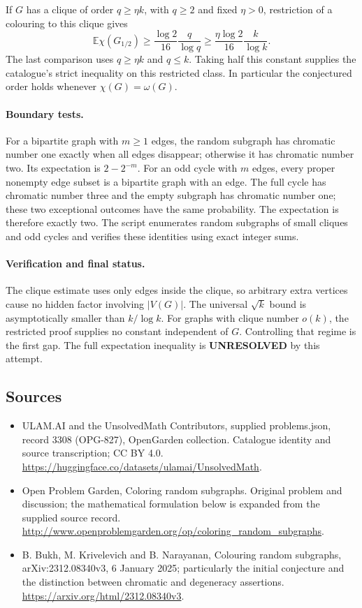 \documentclass[11pt,a4paper]{article}
\begin{document}
If $G$ has a clique of order $q\ge\eta k$, with $q\ge2$ and fixed $\eta>0$, restriction of a colouring to this clique gives
\[
 \mathbb E\chi(G_{1/2})\ge\frac{\log 2}{16}\frac{q}{\log q}
 \ge\frac{\eta\log 2}{16}\frac{k}{\log k}.
\]
The last comparison uses $q\ge\eta k$ and $q\le k$. Taking half this constant supplies the catalogue's strict inequality on this restricted class. In particular the conjectured order holds whenever $\chi(G)=\omega(G)$.

\paragraph{Boundary tests.}
For a bipartite graph with $m\ge1$ edges, the random subgraph has chromatic number one exactly when all edges disappear; otherwise it has chromatic number two. Its expectation is $2-2^{-m}$. For an odd cycle with $m$ edges, every proper nonempty edge subset is a bipartite graph with an edge. The full cycle has chromatic number three and the empty subgraph has chromatic number one; these two exceptional outcomes have the same probability. The expectation is therefore exactly two. The script enumerates random subgraphs of small cliques and odd cycles and verifies these identities using exact integer sums.

\paragraph{Verification and final status.}
The clique estimate uses only edges inside the clique, so arbitrary extra vertices cause no hidden factor involving $|V(G)|$. The universal $\sqrt{k}$ bound is asymptotically smaller than $k/\log k$. For graphs with clique number $o(k)$, the restricted proof supplies no constant independent of $G$. Controlling that regime is the first gap. The full expectation inequality is \textbf{UNRESOLVED} by this attempt.

\subsection{Sources}
\begin{itemize}
\item[S1] ULAM.AI and the UnsolvedMath Contributors, supplied problems.json, record 3308 (OPG-827), OpenGarden collection. Catalogue identity and source transcription; CC BY 4.0.
\url{https://huggingface.co/datasets/ulamai/UnsolvedMath}.
\item[S2] Open Problem Garden, Coloring random subgraphs. Original problem and discussion; the mathematical formulation below is expanded from the supplied source record.
\url{http://www.openproblemgarden.org/op/coloring_random_subgraphs}.
\item[S3] B. Bukh, M. Krivelevich and B. Narayanan, Colouring random subgraphs, arXiv:2312.08340v3, 6 January 2025; particularly the initial conjecture and the distinction between chromatic and degeneracy assertions.
\url{https://arxiv.org/html/2312.08340v3}.
\end{itemize}
\end{document}
